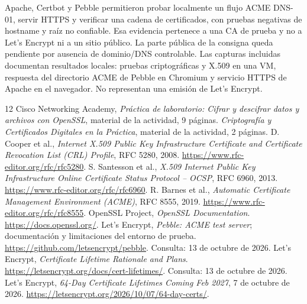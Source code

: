 \documentclass[11pt,a4paper]{article}
\begin{document}
Apache, Certbot y Pebble permitieron probar localmente un flujo ACME DNS-01,
servir HTTPS y verificar una cadena de certificados, con pruebas negativas de
hostname y raíz no confiable. Esa evidencia pertenece a una CA de prueba y no
a Let's Encrypt ni a un sitio público. La parte pública de la consigna queda
pendiente por ausencia de dominio/DNS controlable. Las capturas incluidas
documentan resultados locales: pruebas criptográficas y X.509 en una VM,
respuesta del directorio ACME de Pebble en Chromium y servicio HTTPS de Apache
en el navegador. No representan una emisión de Let's Encrypt.

\begin{thebibliography}{12}
Cisco Networking Academy, \emph{Práctica de laboratorio: Cifrar y descifrar
datos y archivos con OpenSSL}, material de la actividad, 9 páginas.
\emph{Criptografía y Certificados Digitales en la Práctica}, material de la
actividad, 2 páginas.
D. Cooper et al., \emph{Internet X.509 Public Key Infrastructure Certificate
and Certificate Revocation List (CRL) Profile}, RFC 5280, 2008.
\url{https://www.rfc-editor.org/rfc/rfc5280}.
S. Santesson et al., \emph{X.509 Internet Public Key Infrastructure Online
Certificate Status Protocol -- OCSP}, RFC 6960, 2013.
\url{https://www.rfc-editor.org/rfc/rfc6960}.
R. Barnes et al., \emph{Automatic Certificate Management Environment
(ACME)}, RFC 8555, 2019.
\url{https://www.rfc-editor.org/rfc/rfc8555}.
OpenSSL Project, \emph{OpenSSL Documentation}.
\url{https://docs.openssl.org/}.
Let's Encrypt, \emph{Pebble: ACME test server}; documentación y limitaciones
del entorno de prueba.
\url{https://github.com/letsencrypt/pebble}. Consulta: 13 de octubre de 2026.
Let's Encrypt, \emph{Certificate Lifetime Rationale and Plans}.
\url{https://letsencrypt.org/docs/cert-lifetimes/}. Consulta: 13 de octubre
de 2026.
Let's Encrypt, \emph{64-Day Certificate Lifetimes Coming Feb 2027},
7 de octubre de 2026.
\url{https://letsencrypt.org/2026/10/07/64-day-certs/}.
\end{thebibliography}
\end{document}
